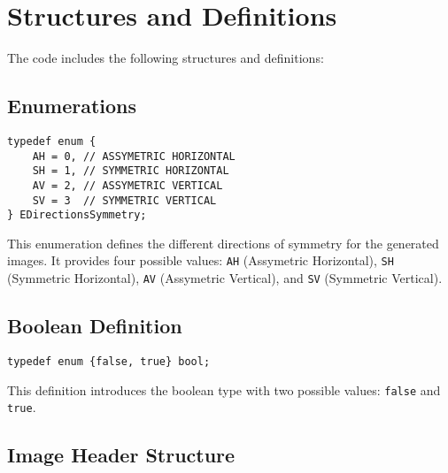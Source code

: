 \documentclass{report}
\begin{document}
\section{Structures and Definitions}

The code includes the following structures and definitions:

\subsection{Enumerations}

\begin{verbatim}
typedef enum {
    AH = 0, // ASSYMETRIC HORIZONTAL
    SH = 1, // SYMMETRIC HORIZONTAL
    AV = 2, // ASSYMETRIC VERTICAL
    SV = 3  // SYMMETRIC VERTICAL
} EDirectionsSymmetry;
\end{verbatim}

This enumeration defines the different directions of symmetry for the generated images. It provides four possible values: \texttt{AH} (Assymetric Horizontal), \texttt{SH} (Symmetric Horizontal), \texttt{AV} (Assymetric Vertical), and \texttt{SV} (Symmetric Vertical).

\subsection{Boolean Definition}

\begin{verbatim}
typedef enum {false, true} bool;
\end{verbatim}

This definition introduces the boolean type with two possible values: \texttt{false} and \texttt{true}.

\subsection{Image Header Structure}
\end{document}
